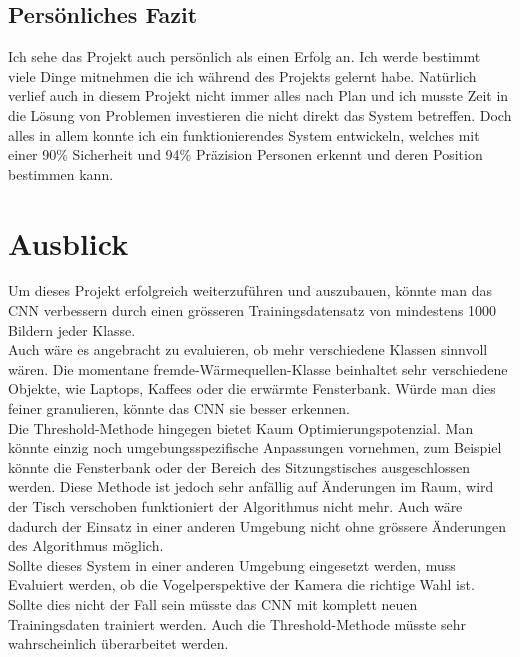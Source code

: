 \subsection{Persönliches Fazit}

Ich sehe das Projekt auch persönlich als einen Erfolg an. Ich werde bestimmt viele Dinge mitnehmen die ich während des Projekts gelernt habe. Natürlich verlief auch in diesem Projekt nicht immer alles nach Plan und ich musste Zeit in die Lösung von Problemen investieren die nicht direkt das System betreffen. Doch alles in allem konnte ich ein funktionierendes System entwickeln, welches mit einer 90\% Sicherheit und 94\% Präzision Personen erkennt und deren Position bestimmen kann.

\section{Ausblick}
Um dieses Projekt erfolgreich weiterzuführen und auszubauen, könnte man das CNN verbessern durch einen grösseren Trainingsdatensatz von mindestens 1000 Bildern jeder Klasse.\\ Auch wäre es angebracht zu evaluieren, ob mehr verschiedene Klassen sinnvoll wären. Die momentane fremde-Wärmequellen-Klasse beinhaltet sehr verschiedene Objekte, wie Laptops, Kaffees oder die erwärmte Fensterbank. Würde man dies feiner granulieren, könnte das \gls{CNN} sie besser erkennen.\\
Die Threshold-Methode hingegen bietet Kaum Optimierungspotenzial. Man könnte einzig noch umgebungsspezifische Anpassungen vornehmen, zum Beispiel könnte die Fensterbank oder der Bereich des Sitzungstisches ausgeschlossen werden. Diese Methode ist jedoch sehr anfällig auf Änderungen im Raum, wird der Tisch verschoben funktioniert der Algorithmus nicht mehr. Auch wäre dadurch der Einsatz in einer anderen Umgebung nicht ohne grössere Änderungen des Algorithmus möglich.
\\
Sollte dieses System in einer anderen Umgebung eingesetzt werden, muss Evaluiert werden, ob die Vogelperspektive der Kamera die richtige Wahl ist. Sollte dies nicht der Fall sein müsste das CNN mit komplett neuen Trainingsdaten trainiert werden. Auch die Threshold-Methode müsste sehr wahrscheinlich überarbeitet werden.



